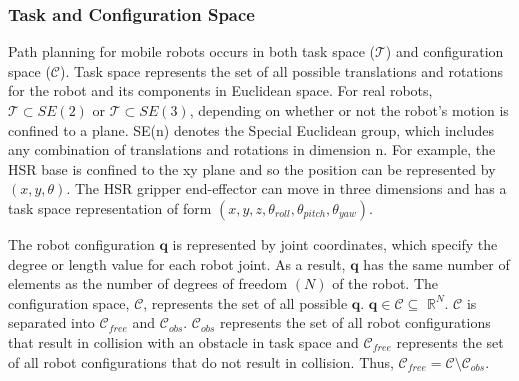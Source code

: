 \documentclass[11pt]{article}
\begin{document}
        \subsubsection{Task and Configuration Space}
            Path planning for mobile robots occurs in both task space ($\mathcal{T}$) and configuration space ($\mathcal{C}$). Task space represents the set of all possible translations and rotations for the robot and its components in Euclidean space. For real robots, $\mathcal{T}\subset SE(2)$ or $\mathcal{T}\subset SE(3)$, depending on whether or not the robot's motion is confined to a plane. SE(n) denotes the Special Euclidean group, which includes any combination of translations and rotations in dimension n. For example, the HSR base is confined to the xy plane and so the position can be represented by $(x,y, \theta)$. The HSR gripper end-effector can move in three dimensions and has a task space representation of form $(x,y,z,\theta_{roll}, \theta_{pitch}, \theta_{yaw})$.\cite{lavalle_planning_2006}
            \par The robot configuration $\mathbf{q}$ is represented by joint coordinates, which specify the degree or length value for each robot joint. As a result, $\mathbf{q}$ has the same number of elements as the number of degrees of freedom $(N)$ of the robot. The configuration space, $\mathcal{C}$, represents the set of all possible $\mathbf{q}$. $\mathbf{q} \in \mathcal{C} \subseteq$ $\mathbb{R}^{N}$. $\mathcal{C}$ is separated into $\mathcal{C}_{free}$ and $\mathcal{C}_{obs}$. $\mathcal{C}_{obs}$ represents the set of all robot configurations that result in collision with an obstacle in task space and $\mathcal{C}_{free}$ represents the set of all robot configurations that do not result in collision. Thus, $\mathcal{C}_{free} = \mathcal{C} \setminus \mathcal{C}_{obs}$.\cite{lavalle_planning_2006}
\end{document}

